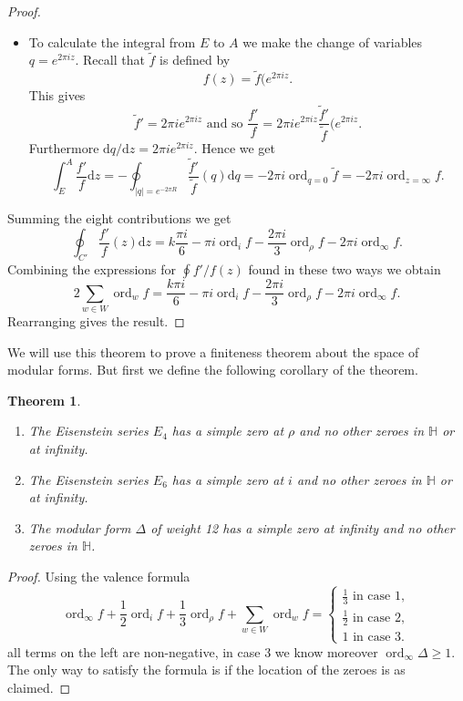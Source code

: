 \documentclass{article}
\newtheorem*{thm}{Theorem}
\theoremstyle{definition}
\DeclareMathOperator{\ord}{ord}
\begin{document}
\begin{proof}
\begin{itemize}
\item To calculate the integral from $E$ to $A$ we make the change of variables $q = e^{2 \pi i z}$.
Recall that $\tilde{f}$ is defined by
\[f(z) = \tilde{f}(e^{2\pi i z}.\]
This gives
\[\tilde{f}' = 2\pi i e^{2\pi i z}\text{ and so }\frac{f'}{f} = 2\pi i e^{2\pi i z}\frac{\tilde{f}'}{\tilde{f}}(e^{2\pi i z}.\]
Furthermore $\mathrm{d}q/\mathrm{d}z = 2\pi ie^{2\pi i z}$.
Hence we get
\[\int_{E}^{A} \frac{f'}{f}\mathrm{d}z = -\oint_{|q| = e^{-2\pi R}}\frac{\tilde{f}'}{\tilde{f}}(q)\mathrm{d}q = -2\pi i \ord_{q=0}\tilde{f} = -2\pi i \ord_{z=\infty}f.\]
\end{itemize}
Summing the eight contributions we get
\[\oint_{C'}\frac{f'}{f}(z)\mathrm{d}z = k\frac{\pi i}{6}- \pi i \ord_{i}f-\frac{2\pi i}{3}\ord_{\rho} f - 2\pi i \ord_\infty f.\]
Combining the expressions for $\oint f'/f(z)$ found in these two ways we obtain
\[2\sum_{w\in W}^{}\ord_w f = \frac{k\pi i}{6} - \pi i \ord_i f -\frac{2\pi i}{3}\ord_\rho f -2\pi i \ord_\infty f.\]
Rearranging gives the result.
\end{proof}

We will use this theorem to prove a finiteness theorem about the space of modular forms.
But first we define the following corollary of the theorem.

\begin{thm}
\begin{enumerate}
\item The Eisenstein series $E_4$ has a simple zero at $\rho$ and no other zeroes in $\mathbb{H}$ or at infinity.
\item The Eisenstein series $E_6$ has a simple zero at $i$ and no other zeroes in $\mathbb{H}$ or at infinity.
\item The modular form $\Delta$ of weight 12 has a simple zero at infinity and no other zeroes in $\mathbb{H}$.
\end{enumerate}
\end{thm}

\begin{proof}
Using the valence formula
\[\ord_\infty f + \frac{1}{2}\ord_i f + \frac{1}{3}\ord_\rho f + \sum_{w\in W}^{} \ord_w f=\begin{cases}
\frac{1}{3}\text{ in case 1},\\
\frac{1}{2}\text{ in case 2},\\
1\text{ in case 3}.
\end{cases}\]
all terms on the left are non-negative, in case 3 we know moreover $\ord_\infty \Delta \ge 1$.
The only way to satisfy the formula is if the location of the zeroes is as claimed.
\end{proof}
\end{document}
